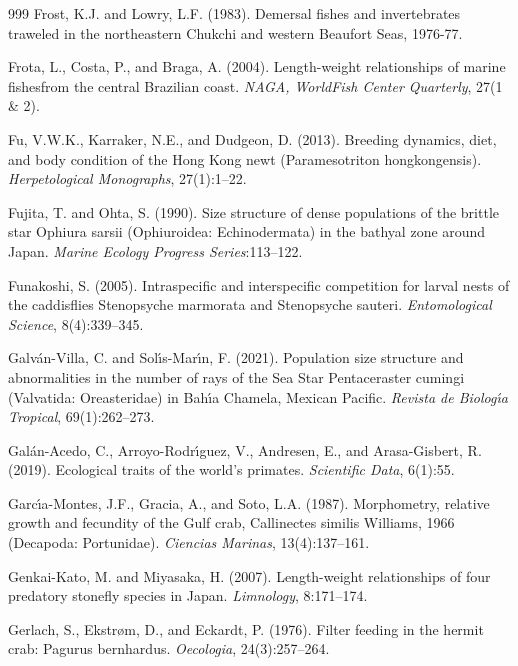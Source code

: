 \begin{thebibliography}{999}
Frost, K.J. and Lowry, L.F. (1983). Demersal fishes and invertebrates traweled in the northeastern Chukchi and western Beaufort Seas, 1976-77.

Frota, L., Costa, P., and Braga, A. (2004). Length-weight relationships of marine fishesfrom the central Brazilian coast. \textit{NAGA, WorldFish Center Quarterly}, 27(1 \& 2).

Fu, V.W.K., Karraker, N.E., and Dudgeon, D. (2013). Breeding dynamics, diet, and body condition of the Hong Kong newt (Paramesotriton hongkongensis). \textit{Herpetological Monographs}, 27(1):1--22.

Fujita, T. and Ohta, S. (1990). Size structure of dense populations of the brittle star Ophiura sarsii (Ophiuroidea: Echinodermata) in the bathyal zone around Japan. \textit{Marine Ecology Progress Series}:113--122.

Funakoshi, S. (2005). Intraspecific and interspecific competition for larval nests of the caddisflies Stenopsyche marmorata and Stenopsyche sauteri. \textit{Entomological Science}, 8(4):339--345.

Galv{\'a}n-Villa, C. and Sol{\'\i}s-Mar{\'\i}n, F. (2021). Population size structure and abnormalities in the number of rays of the Sea Star Pentaceraster cumingi (Valvatida: Oreasteridae) in Bah{\'\i}a Chamela, Mexican Pacific. \textit{Revista de Biolog{\'\i}a Tropical}, 69(1):262--273.

Gal{\'a}n-Acedo, C., Arroyo-Rodr{\'\i}guez, V., Andresen, E., and Arasa-Gisbert, R. (2019). Ecological traits of the world's primates. \textit{Scientific Data}, 6(1):55.

Garc{\'\i}a-Montes, J.F., Gracia, A., and Soto, L.A. (1987). Morphometry, relative growth and fecundity of the Gulf crab, Callinectes similis Williams, 1966 (Decapoda: Portunidae). \textit{Ciencias Marinas}, 13(4):137--161.

Genkai-Kato, M. and Miyasaka, H. (2007). Length-weight relationships of four predatory stonefly species in Japan. \textit{Limnology}, 8:171--174.

Gerlach, S., Ekstr{\o}m, D., and Eckardt, P. (1976). Filter feeding in the hermit crab: Pagurus bernhardus. \textit{Oecologia}, 24(3):257--264.


\end{thebibliography}
